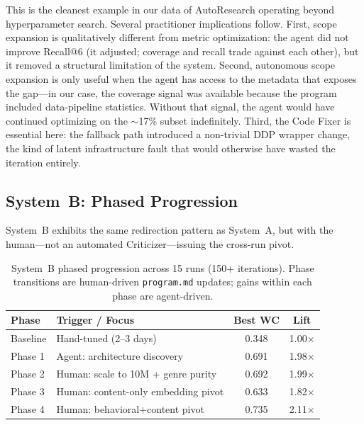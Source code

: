 \documentclass[conference]{IEEEtran}
\begin{document}
This is the cleanest example in our data of AutoResearch operating beyond hyperparameter search. Several practitioner implications follow. First, scope expansion is qualitatively different from metric optimization: the agent did not improve Recall@6 (it adjusted; coverage and recall trade against each other), but it removed a structural limitation of the system. Second, autonomous scope expansion is only useful when the agent has access to the metadata that exposes the gap---in our case, the coverage signal was available because the program included data-pipeline statistics. Without that signal, the agent would have continued optimizing on the ${\sim}$17\% subset indefinitely. Third, the Code Fixer is essential here: the fallback path introduced a non-trivial DDP wrapper change, the kind of latent infrastructure fault that would otherwise have wasted the iteration entirely.

\subsection{System~B: Phased Progression}

System~B exhibits the same redirection pattern as System~A, but with the human---not an automated Criticizer---issuing the cross-run pivot.

\begin{table}[t]
  \caption{System~B phased progression across 15 runs (150+ iterations).
  Phase transitions are human-driven \texttt{program.md} updates; gains
  within each phase are agent-driven.}
  \label{tab:sysb-phases}
  \centering
  \begin{tabular}{llcc}
    \toprule
    Phase & Trigger / Focus & Best WC & Lift \\
    \midrule
    Baseline & Hand-tuned (2--3 days)              & 0.348  & 1.00$\times$ \\
    Phase 1  & Agent: architecture discovery        & 0.691  & 1.98$\times$ \\
    Phase 2  & Human: scale to 10M + genre purity   & 0.692  & 1.99$\times$ \\
    Phase 3  & Human: content-only embedding pivot  & 0.633  & 1.82$\times$ \\
    Phase 4  & Human: behavioral+content pivot      & 0.735  & 2.11$\times$ \\
    \bottomrule
  \end{tabular}
\end{table}
\end{document}
